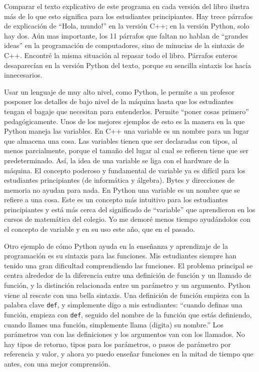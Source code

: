 Comparar el texto explicativo de este programa en cada versión del
libro ilustra más de lo que esto significa para los estudiantes principiantes.
Hay trece párrafos de explicación de ``Hola, mundo!'' en la versión
C++; en la versión Python, solo hay dos. Aún mas importante, los 11
párrafos que faltan no hablan de ``grandes ideas'' en la programación
de computadores, sino de minucias de la sintaxis de C++. Encontré
la misma situación al repasar todo el libro. Párrafos enteros desaparecían
en la versión Python del texto, porque su sencilla sintaxis los hacía
innecesarios.

Usar un lenguaje de muy alto nivel, como Python, le permite a un profesor
posponer los detalles de bajo nivel de la máquina hasta que los estudiantes
tengan el bagaje que necesitan para entenderlos. Permite ``poner
cosas primero'' pedagógicamente. Unos de los mejores ejemplos de
esto es la manera en la que Python maneja las variables. En C++ una
variable es un nombre para un lugar que almacena una cosa. Las variables
tienen que ser declaradas con tipos, al menos parcialmente, porque
el tamaño del lugar al cual se refieren tiene que ser predeterminado.
Así, la idea de una variable se liga con el hardware de la máquina.
El concepto poderoso y fundamental de variable ya es difícil para
los estudiantes principiantes (de informática y álgebra). Bytes y
direcciones de memoria no ayudan para nada. En Python una variable
es un nombre que se refiere a una cosa. Este es un concepto más intuitivo
para los estudiantes principiantes y está más cerca del significado
de ``variable'' que aprendieron en los cursos de matemática del
colegio. Yo me demoré menos tiempo ayudándolos con el concepto de
variable y en su uso este año, que en el pasado.

Otro ejemplo de cómo Python ayuda en la enseñanza y aprendizaje de
la programación es su sintaxis para las funciones. Mis estudiantes
siempre han tenido una gran dificultad comprendiendo las funciones.
El problema principal se centra alrededor de la diferencia entre una
definición de función y un llamado de función, y la distinción relacionada
entre un parámetro y un argumento. Python viene al rescate con una
bella sintaxis. Una definición de función empieza con la palabra clave
\texttt{def}, y simplemente digo a mis estudiantes: ``cuando definas
una función, empieza con \texttt{def}, seguido del nombre de la función
que estás definiendo, cuando llames una función, simplemente llama
(digita) su nombre.'' Los parámetros van con las definiciones y los
argumentos van con los llamados. No hay tipos de retorno, tipos para
los parámetros, o pasos de parámetro por referencia y valor, y ahora
yo puedo enseñar funciones en la mitad de tiempo que antes, con una
mejor comprensión.

